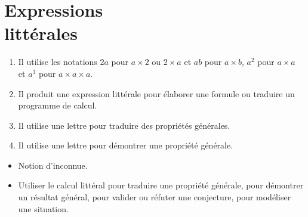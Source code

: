 \themaN
\graphicspath{{../../S08_Expressions_litterales/Images/}}

\chapter{Expressions\\littérales}
\label{S08}


\begin{autoeval}
   \small
   \begin{enumerate}
      \item Il utilise les notations $2a$ pour $a\times2$ ou $2\times a$ et $ab$ pour $a\times b$, $a^2$ pour $a\times a$ et $a^3$ pour $a\times a\times a$.
      \item Il produit une expression littérale pour élaborer une formule ou traduire un programme de calcul.
      \item Il utilise une lettre pour traduire des propriétés générales.
      \item Il utilise une lettre pour démontrer une propriété générale.
   \end{enumerate}
\end{autoeval}

\begin{prerequis}
   \begin{itemize}
      \item Notion d'inconnue.
      \item[\com] Utiliser le calcul littéral pour traduire une propriété générale, pour démontrer un résultat général, pour valider ou réfuter une conjecture, pour modéliser une situation.
   \end{itemize}
\end{prerequis}

\vfill

